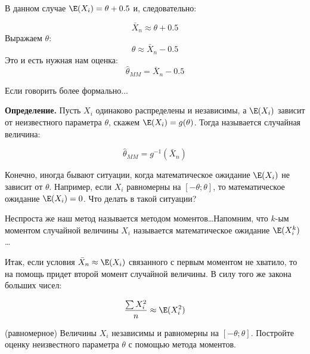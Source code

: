 \documentclass[12pt, a4paper, oneside]{article}
\begin{document}
\begin{sol}
В данном случае $ \E(X_{i})=\theta+0.5 $ и, следовательно:

\[ \bar{X}_{n}\approx \theta+0.5 \]
Выражаем $ \theta $:
\[ \theta\approx \bar{X}_{n}-0.5 \]
Это и есть нужная нам оценка:
\[ \hat{\theta}_{MM}=\bar{X}_{n}-0.5 \]
\end{sol}


Если говорить более формально...

\textbf{Определение.} Пусть $ X_{i} $ одинаково распределены и независимы, а $ \E(X_{i}) $ зависит от неизвестного параметра $ \theta $, скажем $ \E(X_{i})=g(\theta) $. Тогда  называется случайная величина:

\[ \hat{\theta}_{MM} = g^{-1}(\bar{X}_{n}) \]

Конечно, иногда бывают ситуации, когда математическое ожидание $ \E(X_{i}) $ не зависит от $ \theta $. Например, если $ X_{i} $ равномерны на $ [-\theta;\theta] $, то математическое ожидание $ \E(X_{i})=0 $. Что делать в такой ситуации? 

Неспроста же наш метод называется методом моментов\ldots  Напомним, что $ k $-ым моментом случайной величины $ X_{i} $ называется математическое ожидание $ \E(X_{i}^{k}) $ \ldots 


Итак, если условия $\bar{X}_{n}\approx \E(X_{i})$ связанного с первым моментом не хватило, то на помощь придет второй момент случайной величины. В силу того же закона больших чисел:

\[ \frac{\sum X_{i}^{2}}{n} \approx \E(X_{i}^{2})\]


\begin{problem}{(равномерное)}
Величины $ X_{i} $ независимы и равномерны на $ [-\theta;\theta] $. Постройте оценку неизвестного параметра $ \theta $ с помощью метода моментов.
\end{problem}
\end{document}
